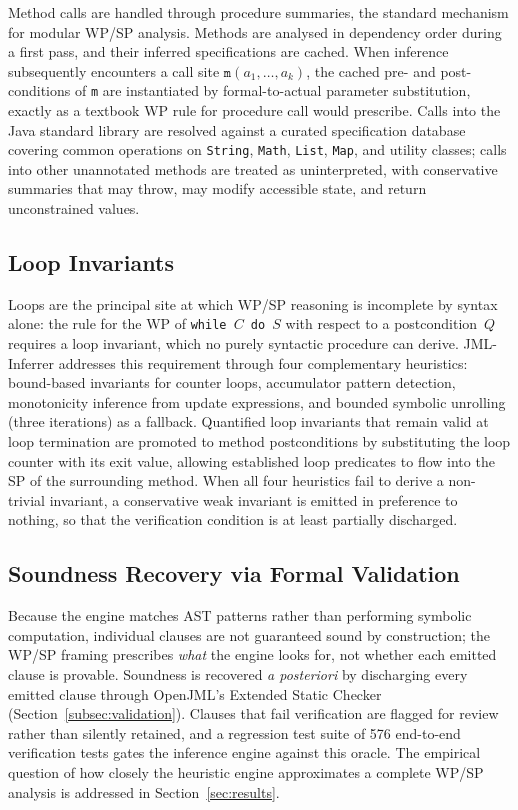 Method calls are handled through procedure summaries, the standard mechanism for modular WP/SP analysis. Methods are analysed in dependency order during a first pass, and their inferred specifications are cached. When inference subsequently encounters a call site $\texttt{m}(a_1, \ldots, a_k)$, the cached pre- and post-conditions of \texttt{m} are instantiated by formal-to-actual parameter substitution, exactly as a textbook WP rule for procedure call would prescribe. Calls into the Java standard library are resolved against a curated specification database covering common operations on \texttt{String}, \texttt{Math}, \texttt{List}, \texttt{Map}, and utility classes; calls into other unannotated methods are treated as uninterpreted, with conservative summaries that may throw, may modify accessible state, and return unconstrained values.

\subsection{Loop Invariants}
\label{subsec:loop-mapping}

Loops are the principal site at which WP/SP reasoning is incomplete by syntax alone: the rule for the WP of \texttt{while $C$ do $S$} with respect to a postcondition~$Q$ requires a loop invariant, which no purely syntactic procedure can derive. JML-Inferrer addresses this requirement through four complementary heuristics: bound-based invariants for counter loops, accumulator pattern detection, monotonicity inference from update expressions, and bounded symbolic unrolling (three iterations) as a fallback. Quantified loop invariants that remain valid at loop termination are promoted to method postconditions by substituting the loop counter with its exit value, allowing established loop predicates to flow into the SP of the surrounding method. When all four heuristics fail to derive a non-trivial invariant, a conservative weak invariant is emitted in preference to nothing, so that the verification condition is at least partially discharged.

\subsection{Soundness Recovery via Formal Validation}
\label{subsec:soundness-recovery}

Because the engine matches AST patterns rather than performing symbolic computation, individual clauses are not guaranteed sound by construction; the WP/SP framing prescribes \emph{what} the engine looks for, not whether each emitted clause is provable. Soundness is recovered \emph{a posteriori} by discharging every emitted clause through OpenJML's Extended Static Checker~\cite{openjml} (Section~\ref{subsec:validation}). Clauses that fail verification are flagged for review rather than silently retained, and a regression test suite of 576 end-to-end verification tests gates the inference engine against this oracle. The empirical question of how closely the heuristic engine approximates a complete WP/SP analysis is addressed in Section~\ref{sec:results}.
